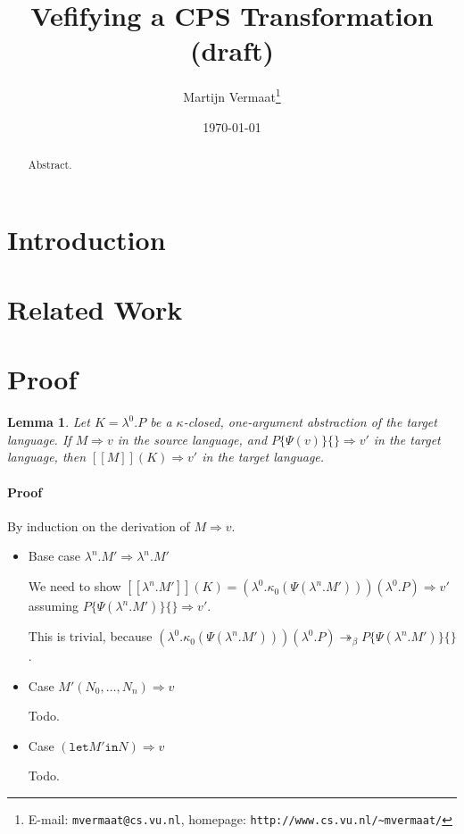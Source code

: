 \documentclass[a4paper,11pt]{article}
\title{Vefifying a CPS Transformation (draft)}
\author{Martijn Vermaat\footnote{E-mail: \texttt{mvermaat@cs.vu.nl},
    homepage: \texttt{http://www.cs.vu.nl/\~{}mvermaat/}}}
\date{\today}
\newtheorem{lemma}{Lemma}
\begin{document}
\maketitle


\begin{abstract}
  Abstract.
\end{abstract}


\section{Introduction}\label{sec:introduction}


\section{Related Work}\label{sec:related}


\section{Proof}\label{sec:proof}

\begin{lemma}
  Let $K = \lambda^{0}.P$ be a $\kappa$-closed, one-argument
  abstraction of the target language. If $M \Rightarrow v$ in the
  source language, and $P\{\Psi(v)\}\{\} \Rightarrow v'$ in the target
  language, then $[\![M]\!](K) \Rightarrow v'$ in the target language.
\end{lemma}

\paragraph{Proof}

By induction on the derivation of $M \Rightarrow v$.

\begin{itemize}
\item{Base case $\lambda^{n}.M' \Rightarrow \lambda^{n}.M'$}

  We need to show $[\![\lambda^{n}.M']\!](K) =
  (\lambda^{0}.\kappa_{0}(\Psi(\lambda^{n}.M'))) (\lambda^{0}.P)
  \Rightarrow v'$ assuming $P\{\Psi(\lambda^{n}.M')\}\{\} \Rightarrow
  v'$.

  This is trivial, because
  $(\lambda^{0}.\kappa_{0}(\Psi(\lambda^{n}.M'))) (\lambda^{0}.P)
  \twoheadrightarrow_{\beta} P\{\Psi(\lambda^{n}.M')\}\{\}$.

\item{Case $M'(N_{0}, \ldots, N_{n}) \Rightarrow v$}

Todo.

\item{Case $(\texttt{let} M' \texttt{in} N) \Rightarrow v$}

Todo.

\end{itemize}
\end{document}
